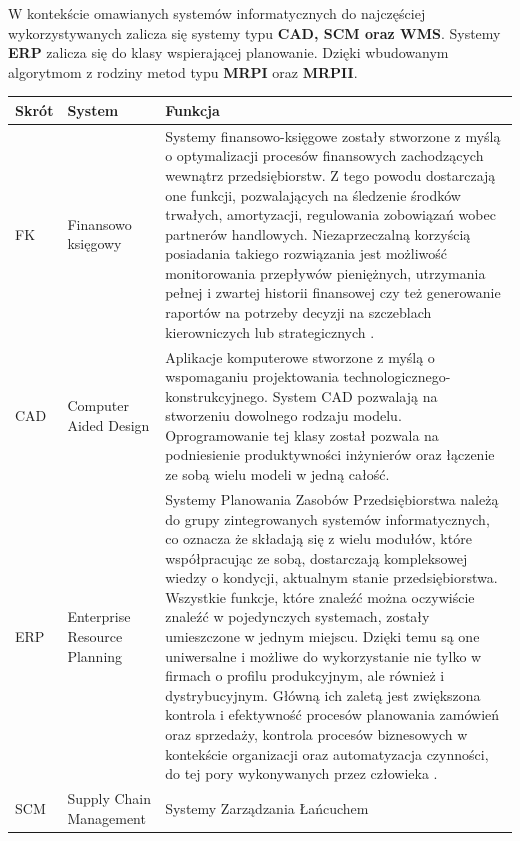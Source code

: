 		W kontekście omawianych systemów informatycznych do najczęściej wykorzystywanych zalicza się systemy typu
		\textbf{CAD, SCM oraz WMS}. Systemy \textbf{ERP} zalicza się do klasy wspierającej planowanie. Dzięki 
		wbudowanym algorytmom z rodziny metod typu \textbf{MRPI} oraz \textbf{MRPII}.
		\begin{table}[H]
			\centering
			\begin{tabular}{| l | l | p{8.5cm} |}
				\hline				
				\textbf{Skrót} 		& \textbf{System}					& \textbf{Funkcja} \\
				\hline
				FK					& Finansowo księgowy 				& Systemy finansowo-księgowe
				zostały stworzone z myślą o optymalizacji procesów finansowych zachodzących
				wewnątrz przedsiębiorstw. Z tego powodu dostarczają one funkcji, pozwalających
				na śledzenie środków trwałych, amortyzacji, regulowania zobowiązań wobec partnerów
				handlowych. Niezaprzeczalną korzyścią posiadania takiego rozwiązania jest możliwość
				monitorowania przepływów pieniężnych, utrzymania pełnej i zwartej historii finansowej
				czy też generowanie raportów na potrzeby decyzji na szczeblach kierowniczych lub
				strategicznych \cite{fk_system}. 	\\
				\hline
				CAD					& Computer Aided Design				& Aplikacje komputerowe
				stworzone z myślą o wspomaganiu projektowania technologicznego-konstrukcyjnego. System
				CAD pozwalają na stworzeniu dowolnego rodzaju modelu. Oprogramowanie tej klasy 
				został pozwala na podniesienie produktywności inżynierów oraz łączenie ze sobą
				wielu modeli w jedną całość. 		\\
				\hline
				ERP					& Enterprise Resource Planning		& Systemy Planowania Zasobów 
				Przedsiębiorstwa należą do grupy zintegrowanych systemów informatycznych, co oznacza
				że składają się z wielu modułów, które współpracując ze sobą, dostarczają
				kompleksowej wiedzy o kondycji, aktualnym stanie przedsiębiorstwa. Wszystkie funkcje, 
				które znaleźć można oczywiście znaleźć w pojedynczych systemach, zostały umieszczone
				w jednym miejscu. Dzięki temu są one uniwersalne i możliwe do wykorzystanie nie tylko
				w firmach o profilu produkcyjnym, ale również i dystrybucyjnym. Główną ich zaletą jest
				zwiększona kontrola i efektywność procesów planowania zamówień oraz sprzedaży, kontrola
				procesów biznesowych w kontekście organizacji oraz automatyzacja czynności, do tej pory
				wykonywanych przez człowieka \cite{erp_system}.\\
				\hline	
				SCM					& Supply Chain Management			& Systemy Zarządzania Łańcuchem

\end{tabular}
\end{table}
